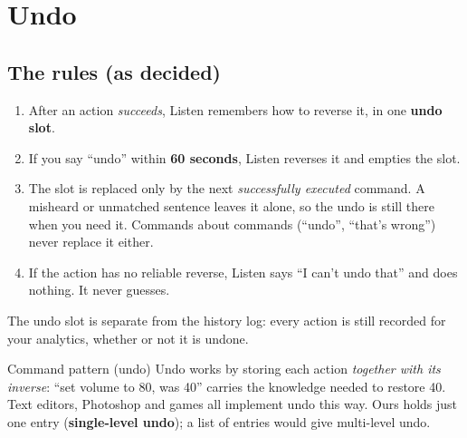 \documentclass[11pt,a4paper]{article}
\begin{document}
\section{Undo}\label{sec:undo}

\subsection{The rules (as decided)}
\begin{enumerate}[nosep]
  \item After an action \emph{succeeds}, Listen remembers how to reverse it, in one
        \textbf{undo slot}.
  \item If you say ``undo'' within \textbf{60 seconds}, Listen reverses it and empties the slot.
  \item The slot is replaced only by the next \emph{successfully executed} command. A misheard
        or unmatched sentence leaves it alone, so the undo is still there when you need it.
        Commands about commands (``undo'', ``that's wrong'') never replace it either.
  \item If the action has no reliable reverse, Listen says ``I can't undo that'' and does
        nothing. It never guesses.
\end{enumerate}
\noindent The undo slot is separate from the history log: every action is still recorded for
your analytics, whether or not it is undone.

\begin{concept}{Command pattern (undo)}
Undo works by storing each action \emph{together with its inverse}: ``set volume to 80, was
40'' carries the knowledge needed to restore 40. Text editors, Photoshop and games all
implement undo this way. Ours holds just one entry (\textbf{single-level undo}); a list of
entries would give multi-level undo.
\end{concept}
\end{document}
